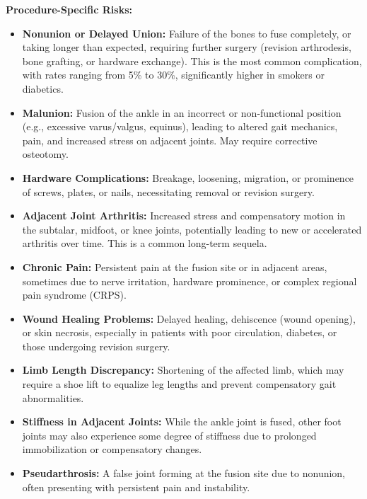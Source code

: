 \textbf{Procedure-Specific Risks:}
\begin{itemize}
  \item \textbf{Nonunion or Delayed Union:} Failure of the bones to fuse completely, or taking longer than expected, requiring further surgery (revision arthrodesis, bone grafting, or hardware exchange). This is the most common complication, with rates ranging from 5\% to 30\%, significantly higher in smokers or diabetics.
  
  \item \textbf{Malunion:} Fusion of the ankle in an incorrect or non-functional position (e.g., excessive varus/valgus, equinus), leading to altered gait mechanics, pain, and increased stress on adjacent joints. May require corrective osteotomy.
  
  \item \textbf{Hardware Complications:} Breakage, loosening, migration, or prominence of screws, plates, or nails, necessitating removal or revision surgery.
  
  \item \textbf{Adjacent Joint Arthritis:} Increased stress and compensatory motion in the subtalar, midfoot, or knee joints, potentially leading to new or accelerated arthritis over time. This is a common long-term sequela.
  
  \item \textbf{Chronic Pain:} Persistent pain at the fusion site or in adjacent areas, sometimes due to nerve irritation, hardware prominence, or complex regional pain syndrome (CRPS).
  
  \item \textbf{Wound Healing Problems:} Delayed healing, dehiscence (wound opening), or skin necrosis, especially in patients with poor circulation, diabetes, or those undergoing revision surgery.
  
  \item \textbf{Limb Length Discrepancy:} Shortening of the affected limb, which may require a shoe lift to equalize leg lengths and prevent compensatory gait abnormalities.
  
  \item \textbf{Stiffness in Adjacent Joints:} While the ankle joint is fused, other foot joints may also experience some degree of stiffness due to prolonged immobilization or compensatory changes.
  
  \item \textbf{Pseudarthrosis:} A false joint forming at the fusion site due to nonunion, often presenting with persistent pain and instability.
\end{itemize}

